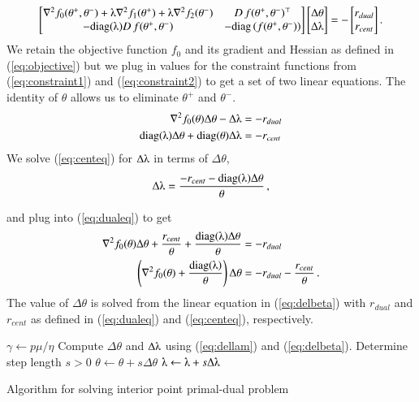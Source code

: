 \documentclass[11pt]{article}
\begin{document}
\[\begin{bmatrix}
\nabla^2f_0(\theta^+, \theta^-) + \lambdaup\nabla^2f_1(\theta^+)+ \lambdaup\nabla^2f_2(\theta^-)&D\,f(\theta^+, \theta^-)^\top\\
-\text{diag}(\lambdaup)D\,f(\theta^+, \theta^-)&-\text{diag}\left(f(\theta^+, \theta^-)\right)
\end{bmatrix}\begin{bmatrix}
\Delta\theta \\ \Delta\lambdaup
\end{bmatrix} = - \begin{bmatrix}
r_{dual}\\r_{cent}
\end{bmatrix}.\]
We retain the objective function $f_0$ and its gradient and Hessian as defined in (\ref{eq:objective}) but we plug in values for the constraint functions from (\ref{eq:constraint1}) and (\ref{eq:constraint2}) to get a set of two linear equations. The identity of $\theta$ allows us to eliminate $\theta^+$ and $\theta^-$.
\begin{align}
\nabla^2f_0(\theta)\Delta\theta - \Delta\lambdaup &= -r_{dual}\label{eq:dualeq}\\
\text{diag}(\lambdaup)\Delta\theta + \text{diag}(\theta)\Delta\lambdaup &= -r_{cent}\,\label{eq:centeq}
\end{align}
We solve (\ref{eq:centeq}) for $\Delta\lambdaup$ in terms of $\Delta\theta$,
\begin{equation}
\Delta\lambdaup = \frac{-r_{cent} - \text{diag}(\lambdaup)\Delta\theta}{\theta}\, ,\label{eq:dellam}
\end{equation}

and plug into (\ref{eq:dualeq}) to get
\begin{align}
\nabla^2f_0(\theta)\Delta\theta +\frac{r_{cent}}{\theta} + \frac{\text{diag}(\lambdaup)\Delta\theta}{\theta} &= -r_{dual}\nonumber\\ 
\left(\nabla^2f_0(\theta) + \frac{\text{diag}(\lambdaup)}{\theta}\right)\Delta\theta &= -r_{dual} - \frac{r_{cent}}{\theta}\,.\label{eq:delbeta}
\end{align}
The value of $\Delta\theta$ is solved from the linear equation in (\ref{eq:delbeta}) with $r_{dual}$ and $r_{cent}$ as defined in (\ref{eq:dualeq}) and (\ref{eq:centeq}), respectively.

\begin{algorithm}\begingroup\fontsize{10}{10}\selectfont
\begin{algorithmic}
\State
{}
	\State $\gamma \gets p\mu/\eta$
	\State Compute $\Delta\theta$ and $\Delta\lambdaup$ using (\ref{eq:dellam}) and (\ref{eq:delbeta}).
	\State Determine step length $s>0$
	\State $\theta \gets \theta + s\Delta\theta$
	\State $\lambdaup \gets \lambdaup + s\Delta\lambdaup$
\EndWhile
\end{algorithmic}\endgroup\caption{Algorithm for solving interior point primal-dual problem}\label{alg:piip}
\end{algorithm} 
\end{document}
